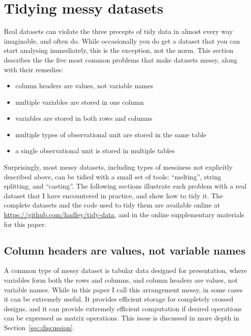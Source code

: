\documentclass[article]{jss}
\begin{document}
\section{Tidying messy datasets}
\label{sec:tidying}

Real datasets can violate the three precepts of tidy data in almost every way imaginable, and often do. While occasionally you do get a dataset that you can start analysing immediately, this is the exception, not the norm.  This section describes the the five most common problems that make datasets messy, along with their remedies:

\begin{itemize}
  \item column headers are values, not variable names
  \item multiple variables are stored in one column
  \item variables are stored in both rows and columns
  \item multiple types of observational unit are stored in the same table
  \item a single observational unit is stored in multiple tables
\end{itemize}

Surprisingly, most messy datasets, including types of messiness not explicitly described above, can be tidied with a small set of tools: ``melting'', string splitting, and ``casting''. The following sections illustrate each problem with a real dataset that I have encountered in practice, and show how to tidy it. The complete datasets and the  code used to tidy them are available online at \url{https://github.com/hadley/tidy-data}, and in the online supplementary materials for this paper.

\subsection{Column headers are values, not variable names}

A common type of messy dataset is tabular data designed for presentation, where variables form both the rows and columns, and column headers are values, not variable names. While in this paper I call this arrangement messy, in some cases it can be extremely useful. It provides efficient storage for completely crossed designs, and it can provide extremely efficient computation if desired operations can be expressed as matrix operations. This issue is discussed in more depth in Section~\ref{sec:discussion}.
\end{document}
